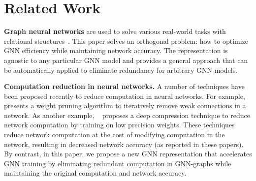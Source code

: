 \section{Related Work}
\label{sec:related}
{\bf Graph neural networks} are used to solve various real-world tasks with relational structures~\cite{CNLMF, GCN, GraphSAGE, DiffPool, GIN}.
This paper solves an orthogonal problem: how to optimize GNN efficiency while maintaining network accuracy.
The \xg representation is agnostic to any particular GNN model and provides a general approach that can be automatically applied to eliminate redundancy for arbitrary GNN models.

{\bf Computation reduction in neural networks.} A number of techniques have been proposed recently to reduce computation in neural networks. 
For example, ~\citet{Han1} presents a weight pruning algorithm to iteratively remove weak connections in a network. 
As another example, ~\citet{Han2} proposes a deep compression technique to reduce network computation by training on low precision weights.
These techniques reduce network computation at the cost of modifying computation in the network, resulting in decreased network accuracy (as reported in these papers).
By contrast, in this paper, we propose a new GNN representation that accelerates GNN training by eliminating redundant computation in GNN-graphs while maintaining the original computation and network accuracy.

